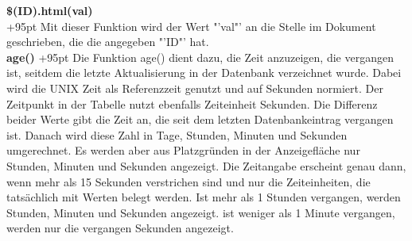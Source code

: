 \documentclass[fontsize = 12pt, paper = a4]{scrreprt}
\begin{document}
\textbf{\$(ID).html(val)}\\
\hangindent+95pt  
Mit dieser Funktion wird der Wert "'val"' an die Stelle im Dokument geschrieben, die die angegeben "'ID"' hat.\\


\textbf{age()}
\hspace{20mm}
\hangindent+95pt  
Die Funktion age() dient dazu, die Zeit anzuzeigen, die vergangen ist, seitdem die letzte Aktualisierung in der Datenbank verzeichnet wurde. Dabei wird die UNIX Zeit als Referenzzeit genutzt und auf Sekunden normiert. Der Zeitpunkt in der Tabelle nutzt ebenfalls Zeiteinheit Sekunden. Die Differenz beider Werte gibt die Zeit an, die seit dem letzten Datenbankeintrag vergangen ist. Danach wird diese Zahl in Tage, Stunden, Minuten und Sekunden umgerechnet. Es werden aber aus Platzgründen in der Anzeigefläche nur Stunden, Minuten und Sekunden angezeigt. Die Zeitangabe erscheint genau dann, wenn mehr als 15 Sekunden verstrichen sind und nur die Zeiteinheiten, die tatsächlich mit Werten belegt werden. Ist mehr als 1 Stunden vergangen, werden Stunden, Minuten und Sekunden angezeigt. ist weniger als 1 Minute vergangen, werden nur die vergangen Sekunden angezeigt.\\ 
\end{document}
